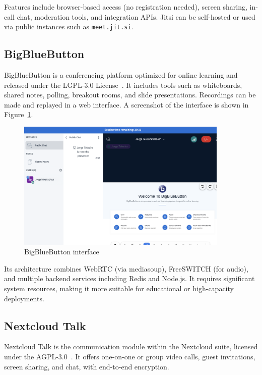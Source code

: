 Features include browser-based access (no registration needed), screen sharing, in-call chat, moderation tools, and integration APIs. Jitsi can be self-hosted or used via public instances such as \texttt{meet.jit.si}.

\subsection{BigBlueButton}

BigBlueButton is a conferencing platform optimized for online learning and released under the LGPL-3.0 License~\cite{bigbluebutton-docs}. It includes tools such as whiteboards, shared notes, polling, breakout rooms, and slide presentations. Recordings can be made and replayed in a web interface. A screenshot of the interface is shown in Figure~\ref{fig:bbb-ui}.

\begin{figure}[H]
  \centering
  \includegraphics[width=0.9\textwidth]{imaxes/bbb-ui.png}
  \caption{BigBlueButton interface}
  \label{fig:bbb-ui}
\end{figure}

Its architecture combines WebRTC (via mediasoup), FreeSWITCH (for audio), and multiple backend services including Redis and Node.js. It requires significant system resources, making it more suitable for educational or high-capacity deployments.

\subsection{Nextcloud Talk}

Nextcloud Talk is the communication module within the Nextcloud suite, licensed under the AGPL-3.0~\cite{nextcloud-talk-docs}. It offers one-on-one or group video calls, guest invitations, screen sharing, and chat, with end-to-end encryption.

